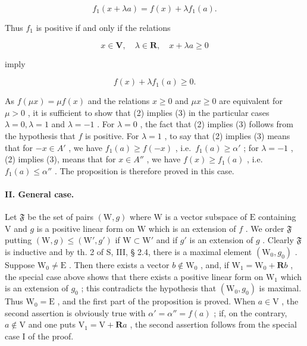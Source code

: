 \[
f _ {1} (x + \lambda a) = f (x) + \lambda f _ {1} (a).
\]

Thus \(f_{1}\) is positive if and only if the relations

\[
x \in \mathbf {V}, \quad \lambda \in \mathbf {R}, \quad x + \lambda a \geqslant 0\tag{2}
\]

imply

\[
f (x) + \lambda f _ {1} (a) \geqslant 0.\tag{3}
\]

As \(f(\mu x) = \mu f(x)\) and the relations \(x \geqslant 0\) and \(\mu x \geqslant 0\) are equivalent for \(\mu > 0\) , it is sufficient to show that (2) implies (3) in the particular cases \(\lambda = 0, \lambda = 1\) and \(\lambda = -1\) . For \(\lambda = 0\) , the fact that (2) implies (3) follows from the hypothesis that \(f\) is positive. For \(\lambda = 1\) , to say that (2) implies (3) means that for \(-x \in A'\) , we have \(f_1(a) \geqslant f(-x)\) , i.e.~\(f_1(a) \geqslant \alpha'\) ; for \(\lambda = -1\) , (2) implies (3), means that for \(x \in A''\) , we have \(f(x) \geqslant f_1(a)\) , i.e.~\(f_1(a) \leqslant \alpha''\) . The proposition is therefore proved in this case.

\paragraph{II. General case.}

Let \(\mathfrak{F}\) be the set of pairs \((\mathrm{W}, g)\) where \(\mathrm{W}\) is a vector subspace of \(\mathrm{E}\) containing \(\mathrm{V}\) and \(g\) is a positive linear form on \(\mathrm{W}\) which is an extension of \(f\) . We order \(\mathfrak{F}\) putting \((\mathrm{W}, g) \leqslant (\mathrm{W}', g')\) if \(\mathrm{W} \subset \mathrm{W}'\) and if \(g'\) is an extension of \(g\) . Clearly \(\mathfrak{F}\) is inductive and by th. 2 of S, III, § 2.4, there is a maximal element \((\mathrm{W}_0, g_0)\) . Suppose \(\mathrm{W}_0 \neq \mathrm{E}\) . Then there exists a vector \(b \notin \mathrm{W}_0\) , and, if \(\mathrm{W}_1 = \mathrm{W}_0 + \mathbf{R}b\) , the special case above shows that there exists a positive linear form on \(\mathrm{W}_1\) which is an extension of \(g_0\) ; this contradicts the hypothesis that \((\mathrm{W}_0, g_0)\) is maximal. Thus \(\mathrm{W}_0 = \mathrm{E}\) , and the first part of the proposition is proved. When \(a \in \mathrm{V}\) , the second assertion is obviously true with \(\alpha' = \alpha'' = f(a)\) ; if, on the contrary, \(a \notin \mathrm{V}\) and one puts \(\mathrm{V}_1 = \mathrm{V} + \mathbf{R}a\) , the second assertion follows from the special case I of the proof.

